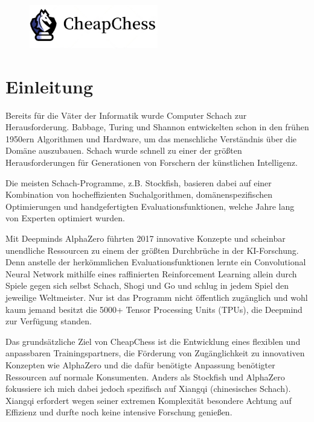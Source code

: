 \documentclass[
  manuscript=article,  %
  layout=publish,  %
  year=2023,
  volume=1,
]{extra/joas}
\begin{document}
\begin{figure}
\centering
\includegraphics[width={0.5\textwidth}]{imgs/loogo.jpg}
\end{figure}
\maketitle

\tableofcontents

\newpage
\section{Einleitung}\label{sec:einleitung}
Bereits für die Väter der Informatik wurde Computer Schach zur Herausforderung. Babbage, Turing und Shannon entwickelten schon in den frühen 1950ern Algorithmen und Hardware, um das menschliche Verständnis über die Domäne auszubauen. Schach wurde schnell zu einer der größten Herausforderungen für Generationen von Forschern der künstlichen Intelligenz. 

Die meisten Schach-Programme, z.B. Stockfish, basieren dabei auf einer Kombination von hocheffizienten Suchalgorithmen, domänenspezifischen Optimierungen und handgefertigten Evaluationsfunktionen, welche Jahre lang von Experten optimiert wurden. 

Mit Deepminds AlphaZero führten 2017 innovative Konzepte und scheinbar unendliche Ressourcen zu einem der größten Durchbrüche in der KI-Forschung. Denn anstelle der herkömmlichen Evaluationsfunktionen lernte ein Convolutional Neural Network mithilfe eines raffinierten Reinforcement Learning allein durch Spiele gegen sich selbst Schach, Shogi und Go und schlug in jedem Spiel den jeweilige Weltmeister. Nur ist das Programm nicht öffentlich zugänglich und wohl kaum jemand besitzt die 5000+ Tensor Processing Units (TPUs), die Deepmind zur Verfügung standen. 

Das grundsätzliche Ziel von CheapChess ist die Entwicklung eines flexiblen und anpassbaren Trainingspartners, die Förderung von Zugänglichkeit zu innovativen Konzepten wie AlphaZero und die dafür benötigte Anpassung benötigter Ressourcen auf normale Konsumenten. Anders als Stockfish und AlphaZero fokussiere ich mich dabei jedoch spezifisch auf Xiangqi (chinesisches Schach). Xiangqi erfordert wegen seiner extremen Komplexität besondere Achtung auf Effizienz und durfte noch keine intensive Forschung genießen.
\end{document}
